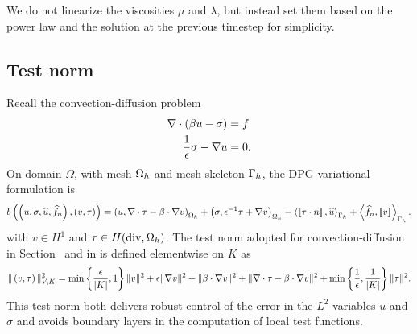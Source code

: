 We do not linearize the viscosities $\mu$ and $\lambda$, but instead set them based on the power law and the solution at the previous timestep for simplicity. 

\subsection{Test norm}

Recall the convection-diffusion problem 
\begin{align*}
\div \left(\beta u - \sigma\right) &= f\\
\frac{1}{\epsilon}\sigma - \grad u &= 0.
\end{align*}
On domain $\Omega$, with mesh $\Oh$ and mesh skeleton $\Gh$, the DPG variational formulation is
\begin{align*}
b\left(\left(u,\sigma, \widehat{u}, \widehat{f}_n\right),
\left( v, \tau \right)\right) = \left(u,\div \tau - \beta \cdot \grad
v\right)_{\Oh} + \left(\sigma, \epsilon^{-1} \tau + \grad v\right)_{\Oh} - \LRa{
\jump{\tau\cdot n}, \widehat{u} }_{\Gh} + \LRa{ \widehat{f}_n,
  \jump{v} }_{\Gh}.
\end{align*}
with $v\in H^1$ and $\tau \in H({\rm div},\Oh)$. The test norm adopted for convection-diffusion in Section~ and in \cite{DPGrobustness2} is defined elementwise on $K$ as
\[
\|\left(v,\tau\right)\|_{V,K}^2 = \min\left\{\frac{\epsilon}{|K|},1\right\}\|v\|^2 + \epsilon \|\grad v\|^2 + \|\beta \cdot \grad v\|^2 + \| \div \tau-\beta\cdot\grad v\|^2 + \min\left\{\frac{1}{\epsilon},\frac{1}{|K|}\right\}\|\tau\|^2.
\]
This test norm both delivers robust control of the error in the $L^2$ variables $u$ and $\sigma$ and avoids boundary layers in the computation of local test functions. 

